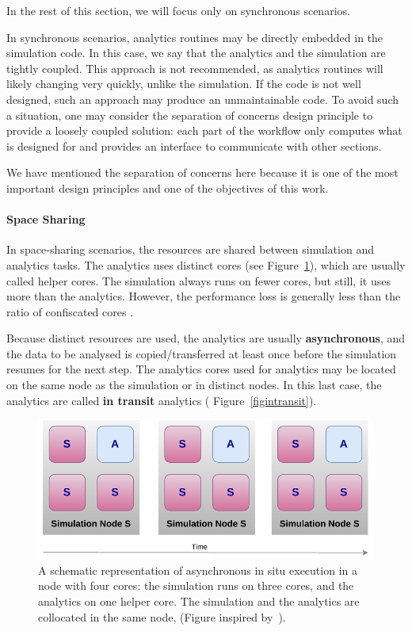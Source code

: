 \begin{itemize}
    In the rest of this section, we will focus only on synchronous scenarios.
    
\end{itemize}

In synchronous scenarios, analytics routines may be directly embedded in the simulation code. In this case, we say that the analytics and the simulation are tightly coupled. This approach is not recommended, as analytics routines will likely changing very quickly, unlike the simulation. If the code is not well designed, such an approach may produce an unmaintainable code.
To avoid such a situation, one may consider the separation of concerns design principle to provide a loosely coupled solution: each part of the workflow only computes what is designed for and provides an interface to communicate with other sections.

We have mentioned the separation of concerns here because it is one of the most important design principles and one of the objectives of this work.

\paragraph{Space Sharing}\label{sec:spacesharing}
In space-sharing scenarios, the resources are shared between simulation and analytics tasks. The analytics uses distinct cores (see Figure~\ref{figinsituhelper}), which are usually called helper cores. The simulation always runs on fewer cores, but still, it uses more than the analytics. However, the performance loss is generally less than the ratio of confiscated cores \cite{zheng2013goldrush, dorier_damaris_2012, Estelle_integration_2018}.

Because distinct resources are used, the analytics are usually \textbf{asynchronous}, and the data to be analysed is copied/transferred  at least once before the simulation resumes for the next step. The analytics cores used for analytics may be located on the same node as the simulation or in distinct nodes. In this last case, the analytics are called \textbf{in transit} analytics ( Figure~\ref{figintransit}). 
\begin{figure}[tb]\centering
\includegraphics[scale=0.9]{figures/insitu_helpercore.pdf}
\caption{A schematic representation of asynchronous in situ execution in a node with four cores: the simulation runs on three cores, and the analytics on one helper core. The simulation and the analytics are collocated in the same node, (Figure inspired by~\cite{Estelle_integration_2018}).}
\label{figinsituhelper}
\end{figure}

